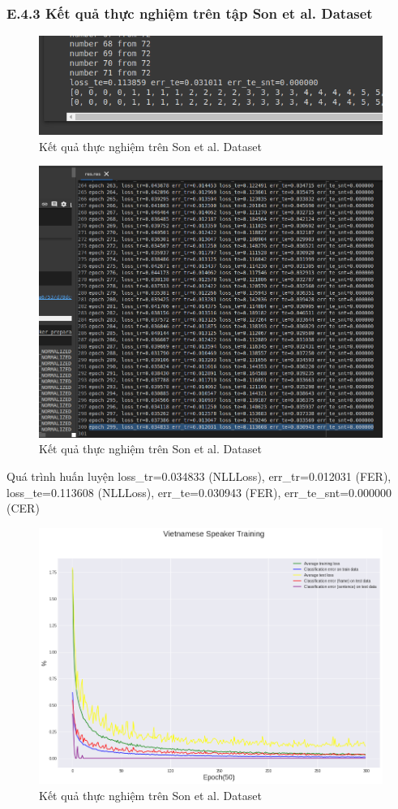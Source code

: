 \documentclass{article}
\begin{document}
	\subsubsection{E.4.3 Kết quả thực nghiệm trên tập Son et al. Dataset}
	\begin{figure}[H]
		\centering
		\includegraphics[width=.75\textwidth]{result/evaluate_result_vn_speaker.png}
		\caption{Kết quả thực nghiệm trên Son et al. Dataset}
		\label{fig:writing-thesis}
	\end{figure}
	\begin{figure}[H]
		\centering
		\includegraphics[width=.75\textwidth]{result/vietnamese_res.png}
		\caption{Kết quả thực nghiệm trên Son et al. Dataset}
		\label{fig:writing-thesis}
	\end{figure}
	 Quá trình huấn luyện loss\_tr=0.034833 (NLLLoss), err\_tr=0.012031 (FER),  loss\_te=0.113608 (NLLLoss),  err\_te=0.030943 (FER), err\_te\_snt=0.000000 (CER)
	\begin{figure}[H]
		\centering
		\includegraphics[width=.75\textwidth]{result/sincnet_vietnamese_plot.png}
		\caption{Kết quả thực nghiệm trên Son et al. Dataset}
		\label{fig:writing-thesis}
	\end{figure}
\end{document}

